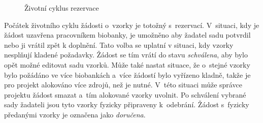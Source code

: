 \documentclass[11pt,draft,oneside]{fithesis2}
\begin{document}
\begin{figure}[hbtp]
\begin{center}
\caption{Životní cyklus rezervace}
\label{fig:implementace:rezervace:cyklus}
\end{center}
\end{figure}

Počátek životního cyklu žádosti o~vzorky je totožný s~rezervací. V~situaci, kdy je žádost uzavřena pracovníkem biobanky, je umožněno aby žadatel sadu potvrdil nebo ji vrátil zpět k doplnění. Tato volba se uplatní v situaci, kdy vzorky nesplňují kladené požadavky. Žádost se tím vrátí do stavu \textit{schválena}, aby bylo opět možné editovat sadu vzorků.
Může také nastat situace, že o~stejné vzorky bylo požádáno ve více biobankách a~více žádostí bylo vyřízeno kladně, takže je pro projekt alokováno více zdrojů, než je nutné. V~této situaci může správce projektu žádost smazat a~tím alokované vzorky uvolnit.
Po schválení vybrané sady žadateli jsou tyto vzorky fyzicky připraveny k~odebrání. Žádost s~fyzicky předanými vzorky je označena jako \textit{doručena}.
\end{document}

